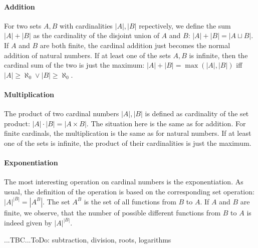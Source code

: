 
\paragraph{Addition} For two sets $A,B$ with cardinalities $|A|,|B|$ repectively, we define the sum $|A| + |B|$ as the cardinality of the disjoint union of $A$ and $B$: $|A| + |B| = |A \sqcup B|$. If $A$ and $B$ are both finite, the cardinal addition just becomes the normal addition of natural numbers. If at least one of the sets $A, B$ is infinite, then the cardinal sum of the two is just the maximum: $|A| + |B| = \max(|A|, |B|)$ iff $|A| \geq \aleph_0 \vee |B| \geq \aleph_0$. 



\paragraph{Multiplication} The product of two cardinal numbers $|A|,|B|$ is defined as cardinality of the set product: $|A| \cdot |B| = |A \times B|$. The situation here is the same as for addition. For finite cardinals, the multiplication is the same as for natural numbers. If at least one of the sets is infinite, the product of their cardinalities is just the maximum.


\paragraph{Exponentiation} The most interesting operation on cardinal numbers is the exponentiation. As usual, the definition of the operation is based on the corresponding set operation: $|A|^{|B|} = |A^B|$. The set $A^B$ is the set of all functions from $B$ to $A$. If $A$ and $B$ are finite, we observe, that the number of possible different functions from $B$ to $A$ is indeed given by $|A|^{|B|}$.

...TBC...ToDo: subtraction, division, roots, logarithms





